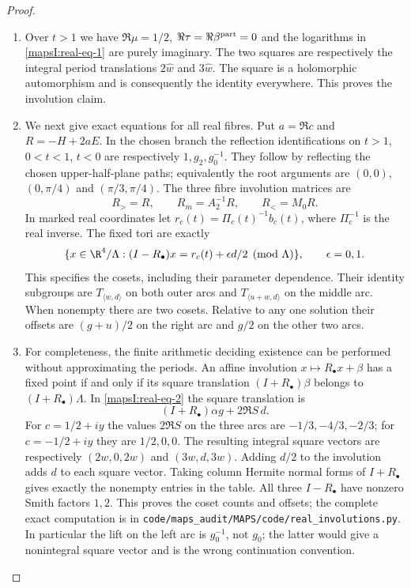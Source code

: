 \begin{proof}
\begin{enumerate}[label=\arabic*.,leftmargin=*]
\item Over $t>1$ we have
$\Re\mu=1/2$, $\Re\tau=\Re\beta^{\rm part}=0$ and the logarithms in
\eqref{mapsI:real-eq-1} are purely imaginary. The two squares are respectively the
integral period translations $2\widehat w$ and $3\widehat w$.
The square is a holomorphic automorphism and is consequently the
identity everywhere. This proves the involution claim.

\item We next give exact equations for all real fibres. Put $a=\Re c$ and
$R=-H+2aE$. In the chosen branch the reflection identifications on
$t>1$, $0<t<1$, $t<0$ are respectively $1,g_2,g_0^{-1}$.
They follow by reflecting the chosen upper-half-plane paths; equivalently
the root arguments are $(0,0)$, $(0,\pi/4)$ and $(\pi/3,\pi/4)$.
The three fibre involution matrices are
\[
 R_>=R,\qquad R_m=A_2^{-1}R,\qquad R_<=M_0R.
 \label{mapsI:real-eq-5}
\]
In marked real coordinates let $r_c(t)=\Pi_c(t)^{-1}b_c(t)$,
where $\Pi_c^{-1}$ is the real inverse. The fixed tori are exactly
\[
 \{x\in\R^4/\Lambda:(I-R_\bullet)x=
                       r_c(t)+\epsilon d/2\pmod\Lambda\},
 \qquad\epsilon=0,1.
 \label{mapsI:real-eq-6}
\]
This specifies the cosets, including their parameter dependence. Their
identity subgroups are $T_{\langle w,d\rangle}$ on both outer arcs and
$T_{\langle u+w,d\rangle}$ on the middle arc. When nonempty there are
two cosets. Relative to any one solution their offsets are
$(g+u)/2$ on the right arc and $g/2$ on the other two arcs.

\item For completeness, the finite arithmetic deciding existence can be
performed without approximating the periods. An affine involution
$x\mapsto R_\bullet x+\beta$ has a fixed point if and only if its
square translation $(I+R_\bullet)\beta$ belongs to
$(I+R_\bullet)\Lambda$. In \eqref{mapsI:real-eq-2} the square translation is
\[
 (I+R_\bullet)\alpha g+2\Re S\,d.
\]
For $c=1/2+iy$ the values $2\Re S$ on the three arcs are
$-1/3,-4/3,-2/3$; for $c=-1/2+iy$ they are $1/2,0,0$.
The resulting integral square vectors are respectively
$(2w,0,2w)$ and $(3w,d,3w)$. Adding $d/2$ to the involution adds $d$
to each square vector. Taking column Hermite normal forms of
$I+R_\bullet$ gives exactly the nonempty entries in the table.
All three $I-R_\bullet$ have nonzero Smith factors $1,2$.
This proves the coset counts and offsets; the complete exact computation
is in \texttt{code/maps\_audit/MAPS/code/real\_involutions.py}. In particular the lift on
the left arc is $g_0^{-1}$, not $g_0$; the latter would give a nonintegral
square vector and is the wrong continuation convention.


\end{enumerate}
\end{proof}
